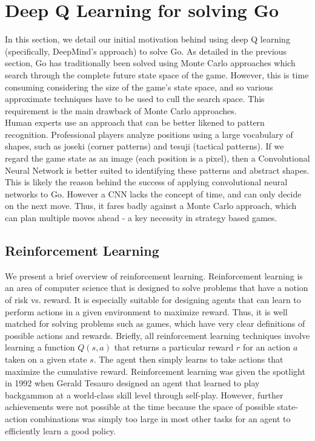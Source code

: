 
\section{Deep Q Learning for solving Go}
In this section, we detail our initial motivation behind using deep Q learning (specifically, DeepMind's approach) to solve Go. As detailed in the previous section, Go has traditionally been solved using Monte Carlo approaches which search through the complete future state space of the game. However, this is time consuming considering the size of the game's state space, and so various approximate techniques have to be used to cull the search space. This requirement is the main drawback of Monte Carlo approaches. 
\\
Human experts use an approach that can be better likened to pattern recognition. Professional players analyze positions using a large vocabulary of shapes, such as joseki (corner patterns) and tesuji (tactical patterns). If we regard the game state as an image (each position is a pixel), then a Convolutional Neural Network is better suited to identifying these patterns and abstract shapes. This is likely the reason behind the success of applying convolutional neural networks to Go. However a CNN lacks the concept of time, and can only decide on the next move. Thus, it fares badly against a Monte Carlo approach, which can plan multiple moves ahead - a key necessity in strategy based games.
\\

\subsection{Reinforcement Learning}
We present a brief overview of reinforcement learning. Reinforcement learning is an area of computer science that is designed to solve problems that have a notion of risk vs. reward. It is especially suitable for designing agents that can learn to perform actions in a given environment to maximize reward. Thus, it is well matched for solving problems such as games, which have very clear definitions of possible actions and rewards. Briefly, all reinforcement learning techniques involve learning a function $Q(s,a)$ that returns a particular reward $r$ for an action $a$ taken on a given state $s$. The agent then simply learns to take actions that maximize the cumulative reward. Reinforcement learning was given the spotlight in 1992 when Gerald Tesauro designed an agent that learned to play backgammon at a world-class skill level through self-play. However, further achievements were not possible at the time because the space of possible state-action combinations was simply too large in most other tasks for an agent to efficiently learn a good policy.

